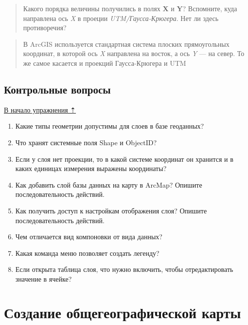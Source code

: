 \documentclass[12pt,]{book}
\begin{document}
\begin{enumerate}
  \begin{quote}
  Какого порядка величины получились в полях \textbf{X} и \textbf{Y}? Вспомните, куда направлена ось \emph{X} в проеции \emph{UTM/Гаусса-Крюгера}. Нет ли здесь противоречия?
  \end{quote}

  \begin{quote}
  В ArcGIS используется стандартная система плоских прямоугольных координат, в которой ось \emph{X} направлена на восток, а ось \emph{Y} --- на север. То же самое касается и проекций Гаусса-Крюгера и UTM
  \end{quote}
\end{enumerate}

\hypertarget{map-design-quaternary-questions}{%
\section{Контрольные вопросы}\label{map-design-quaternary-questions}}

\protect\hyperlink{map-design-quaternary}{В начало упражнения ⇡}

\begin{enumerate}
\def\labelenumi{\arabic{enumi}.}
\item
  Какие типы геометрии допустимы для слоев в базе геоданных?
\item
  Что хранят системные поля Shape и ObjectID?
\item
  Если у слоя нет проекции, то в какой системе координат он хранится и в каких единицах измерения выражены координаты?
\item
  Как добавить слой базы данных на карту в ArcMap? Опишите последовательность действий.
\item
  Как получить доступ к настройкам отображения слоя? Опишите последовательность действий.
\item
  Чем отличается вид компоновки от вида данных?
\item
  Какая команда меню позволяет создать легенду?
\item
  Если открыта таблица слоя, что нужно включить, чтобы отредактировать значение в ячейке?
\end{enumerate}

\hypertarget{map-design-general}{%
\chapter{Создание общегеографической карты}\label{map-design-general}}
\end{document}
